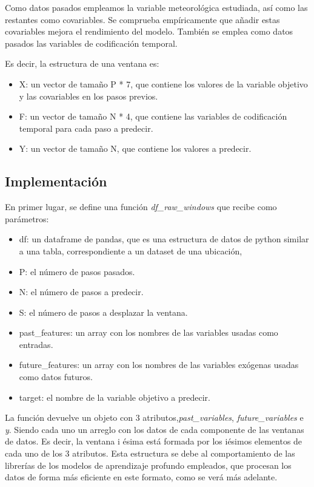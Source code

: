 Como datos pasados empleamos la variable meteorológica estudiada, así como las restantes como covariables. Se comprueba empíricamente que 
añadir estas covariables mejora el rendimiento del modelo. También se emplea como datos pasados las variables de codificación temporal. 

Es decir, la estructura de una ventana es:
\begin{itemize}
    \item X: un vector de tamaño P * 7, que contiene los valores de la variable objetivo y las covariables en los pasos previos.
    \item F: un vector de tamaño N * 4, que contiene las variables de codificación temporal para cada paso a predecir.
    \item Y: un vector de tamaño N, que contiene los valores a predecir.
\end{itemize}

\subsection{Implementación}
En primer lugar, se define una función \textit{df\_raw\_windows} que recibe como parámetros:
\begin{itemize}
    \item df: un dataframe de pandas, que es una estructura de datos de python similar a una tabla, correspondiente a un dataset de una ubicación,
    \item P: el número de pasos pasados.
    \item N: el número de pasos a predecir.
    \item S: el número de pasos a desplazar la ventana.
    \item past\_features: un array con los nombres de las variables usadas como entradas.
    \item future\_features: un array con los nombres de las variables exógenas usadas como datos futuros.
    \item target: el nombre de la variable objetivo a predecir.
\end{itemize}

La función devuelve un objeto con 3 atributos,\textit{past\_variables}, \textit{future\_variables} e \textit{y}.
Siendo cada uno un arreglo con los datos de cada componente de las ventanas de datos. Es decir, la ventana i ésima
está formada por los iésimos elementos de cada uno de los 3 atributos. Esta estructura se debe al comportamiento
de las librerías de los modelos de aprendizaje profundo empleados, que procesan los datos de forma más eficiente en este formato,
como se verá más adelante.

